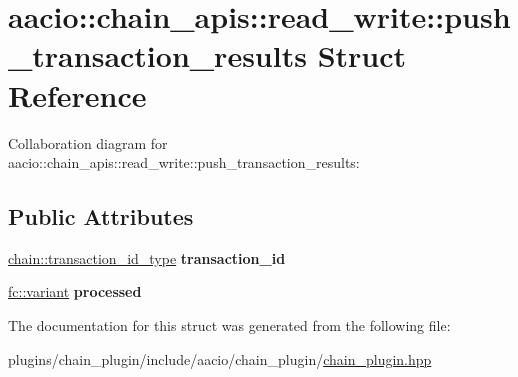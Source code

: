 \hypertarget{structaacio_1_1chain__apis_1_1read__write_1_1push__transaction__results}{}\section{aacio\+:\+:chain\+\_\+apis\+:\+:read\+\_\+write\+:\+:push\+\_\+transaction\+\_\+results Struct Reference}
\label{structaacio_1_1chain__apis_1_1read__write_1_1push__transaction__results}


Collaboration diagram for aacio\+:\+:chain\+\_\+apis\+:\+:read\+\_\+write\+:\+:push\+\_\+transaction\+\_\+results\+:
\subsection*{Public Attributes}
\begin{DoxyCompactItemize}
\item 
\mbox{\label{structaacio_1_1chain__apis_1_1read__write_1_1push__transaction__results_a9c06e9f94a010ca78b7a6e627a56ce56}} 
\mbox{\hyperlink{classfc_1_1sha256}{chain\+::transaction\+\_\+id\+\_\+type}} {\bfseries transaction\+\_\+id}
\item 
\mbox{\label{structaacio_1_1chain__apis_1_1read__write_1_1push__transaction__results_ad86a75cd46246f70127a6ca73646af37}} 
\mbox{\hyperlink{classfc_1_1variant}{fc\+::variant}} {\bfseries processed}
\end{DoxyCompactItemize}


The documentation for this struct was generated from the following file\+:\begin{DoxyCompactItemize}
\item 
plugins/chain\+\_\+plugin/include/aacio/chain\+\_\+plugin/\mbox{\hyperlink{chain__plugin_8hpp}{chain\+\_\+plugin.\+hpp}}\end{DoxyCompactItemize}
